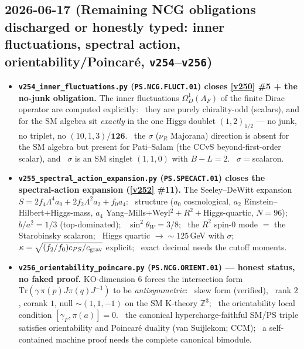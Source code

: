 \subsection*{2026-06-17 (Remaining NCG obligations discharged or honestly typed: inner fluctuations, spectral action, orientability/Poincar\'e, \texttt{v254}--\texttt{v256})}
\begin{itemize}
\item \textbf{\texttt{v254\_inner\_fluctuations.py} (\texttt{PS.NCG.FLUCT.01}) closes \vref{v250} \#5 + the
  no-junk obligation.} The inner fluctuations $\Omega^1_D(A_F)$ of the finite Dirac operator are computed
  explicitly: \mE\ they are purely chirality-odd (scalars), and for the SM algebra sit \emph{exactly} in the
  one Higgs doublet $(1,2)_{1/2}$ --- no junk, no triplet, no $(10,1,3)/\mathbf{126}$. \mE\ the $\sigma$
  ($\nu_R$ Majorana) direction is absent for the SM algebra but present for Pati--Salam (the CCvS
  beyond-first-order scalar), and \mE\ $\sigma$ is an SM singlet $(1,1,0)$ with $B{-}L=2$. \mC\
  $\sigma={}$scalaron.
\item \textbf{\texttt{v255\_spectral\_action\_expansion.py} (\texttt{PS.SPECACT.01}) closes the
  spectral-action expansion (\vref{v252} \#11).} The Seeley--DeWitt expansion
  $S=2f_4\Lambda^4 a_0+2f_2\Lambda^2 a_2+f_0 a_4$: \mE\ structure ($a_0$ cosmological, $a_2$
  Einstein--Hilbert$+$Higgs-mass, $a_4$ Yang--Mills$+$Weyl$^2+R^2+$Higgs-quartic, $N=96$); \mE\ $b/a^2=1/3$
  (top-dominated); \mE\ $\sin^2\theta_W=3/8$; \mE\ the $R^2$ spin-$0$ mode $=$ the Starobinsky scalaron; \mC\
  Higgs quartic $\to{\sim}125$\,GeV with $\sigma$; \mC\ $\kappa=\sqrt{(f_2/f_0)c_{PS}/c_{\rm grav}}$ explicit;
  \mO\ exact decimal needs the cutoff moments.
\item \textbf{\texttt{v256\_orientability\_poincare.py} (\texttt{PS.NCG.ORIENT.01}) --- honest status, no
  faked proof.} KO-dimension $6$ forces the intersection form $\mathrm{Tr}(\gamma\,\pi(p)J\pi(q)J^{-1})$ to be
  \emph{antisymmetric}: \mE\ skew form (verified), \mE\ rank $2$, corank $1$, null $\sim(1,1,-1)$ on the SM
  K-theory $\mathbb Z^3$; \mE\ the orientability local condition $[\gamma_F,\pi(a)]=0$. \mC\ the canonical
  hypercharge-faithful SM/PS triple satisfies orientability and Poincar\'e duality (van Suijlekom; CCM); \mO\
  a self-contained machine proof needs the complete canonical bimodule.
\end{itemize}

